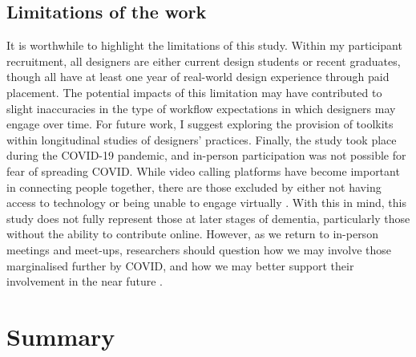 \subsection{Limitations of the work}
It is worthwhile to highlight the limitations of this study. Within my participant recruitment, all designers are either current design students or recent graduates, though all have at least one year of real-world design experience through paid placement. The potential impacts of this limitation may have contributed to slight inaccuracies in the type of workflow expectations in which designers may engage over time. For future work, I suggest exploring the provision of toolkits within longitudinal studies of designers’ practices. Finally, the study took place during the COVID-19 pandemic, and in-person participation was not possible for fear of spreading COVID. While video calling platforms have become important in connecting people together, there are those excluded by either not having access to technology or being unable to engage virtually \citep{masoud2021we}. With this in mind, this study does not fully represent those at later stages of dementia, particularly those without the ability to contribute online. However, as we return to in-person meetings and meet-ups, researchers should question how we may involve those marginalised further by COVID, and how we may better support their involvement in the near future \citep{braybrooke2021care}.

\section{Summary}
\label{D3:Summary}

